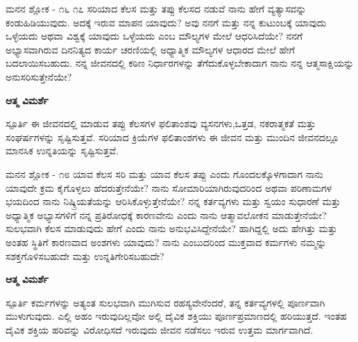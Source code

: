 \newpage
\begin{mananam}{\mananamfont \large ಮನನ ಶ್ಲೋಕ - ೧೬ ೧೭}
\mananamtext ಸರಿಯಾದ ಕೆಲಸ ಮತ್ತು ತಪ್ಪು ಕೆಲಸದ ನಡುವೆ ನಾನು ಹೇಗೆ ವ್ಯತ್ಯಾಸವನ್ನು ಕಂಡುಹಿಡಿಯುವುದು. ಅದಕ್ಕೆ ಇರುವ ಮಾಪನ ಯಾವುದು? ಅವು ನನಗೆ ಮತ್ತು ನನ್ನ ಕುಟುಂಬಕ್ಕೆ ಯಾವುದು ಒಳ್ಳೆಯದು ಅಥವಾ ವಿಶ್ವಕ್ಕೆ ಯಾವುದು ಒಳ್ಳೆಯದು ಎಂಬ ಮೌಲ್ಯಗಳ ಮೇಲೆ ಆಧರಿಸಿದೆಯೇ? ನನಗೆ ಅಭ್ಯಾಸವಾಗಿರುವ ದಿನನಿತ್ಯದ ಕಾರ್ಯ ಚರಣಿಯಲ್ಲಿ ಅಧ್ಯಾತ್ಮಿಕ ಮೌಲ್ಯಗಳ ಆಧಾರದ ಮೇಲೆ ಹೇಗೆ ಬದಲಾಯಿಸಬಹುದು. ನನ್ನ ಜೀವನದಲ್ಲಿ ಕಠಿಣ ನಿರ್ಧಾರಗಳನ್ನು ತೆಗೆದುಕೊಳ್ಳಬೇಕಾದಾಗ ನಾನು ನನ್ನ ಆತ್ಮಸಾಕ್ಷಿಯನ್ನು ಅನುಸರಿಸುತ್ತೇನೆಯೇ?
\end{mananam}
\WritingHand\enspace\textbf{ಆತ್ಮ ವಿಮರ್ಶೆ}\\
\begin{inspiration}{\mananamfont \large ಸ್ಪೂರ್ತಿ}
\mananamtext ಈ ಜೀವನದಲ್ಲಿ ಮಾಡುವ ತಪ್ಪು ಕೆಲಸಗಳ ಫಲಿತಾಂಶವು ವ್ಯಸನಗಳು,ಒತ್ತಡ, ನಕರಾತ್ಮಕತೆ ಮತ್ತು ಸಂಘರ್ಷಗಳನ್ನು ಸೃಷ್ಟಿಸುತ್ತವೆ. ಸರಿಯಾದ ಕ್ರಿಯೆಗಳ ಫಲಿತಾಂಶಗಳು ಈ ಜೀವನ ಮತ್ತು ಮುಂದಿನ ಜೀವನದಲ್ಲೂ ಮಾನಸಿಕ ಉನ್ನತಿಯನ್ನು ಸೃಷ್ಟಿಸುತ್ತವೆ.
\end{inspiration}
\newpage

\begin{mananam}{\mananamfont \large ಮನನ ಶ್ಲೋಕ - ೧೮}
\mananamtext ಯಾವ ಕೆಲಸ ಸರಿ ಮತ್ತು ಯಾವ ಕೆಲಸ ತಪ್ಪು ಎಂದು ಗೊಂದಲಕ್ಕೊಳಗಾದಾಗ ನಾನು ಯಾವುದೇ ಕ್ರಮ ಕೈಗೊಳ್ಳಲು ಹೆದರುತ್ತೇನೆಯೇ? ನಾನು  ಸೋಮಾರಿಯಾಗಿರುವುದರಿಂದ ಅಥವಾ ಪರಿಣಾಮಗಳ ಭಯದಿಂದ ನಾನು ನಿಷ್ಕ್ರಿಯತೆಯನ್ನು ಆರಿಸಿಕೊಳ್ಳುತ್ತೇನೆಯೇ? ನನ್ನ ಕರ್ತವ್ಯಗಳು ಮತ್ತು ಸ್ವಯಂ ಸುಧಾರಣೆ ಮತ್ತು ಅಧ್ಯಾತ್ಮಿಕ ಅಭ್ಯಾಸಗಳಿಗೆ ನನ್ನ ಪ್ರತಿರೋಧಕ್ಕೆ ಕಾರಣವೇನು ಎಂದು ನಾನು ಆತ್ಮಾವಲೋಕನ ಮಾಡುತ್ತೇನೆಯೇ?\\
ಸುಲಭವಾಗಿ ಕೆಲಸ ಮಾಡುವುದು ಹೇಗೆ ಎಂದು ನಾನು ಅನುಭವಿಸಿದ್ದೇನೆಯೇ? ಹಾಗಿದ್ದಲ್ಲಿ ಅದು ಹೇಗಿತ್ತು ಮತ್ತು ಅಂತಹ ಸ್ಥಿತಿಗೆ ಕಾರಣವಾದ ಅಂಶಗಳು ಯಾವುದು? ನಾನು ಎಂಬುದರಿಂದ ಮುಕ್ತವಾದ ಕರ್ಮಗಳು ನಮ್ಮನ್ನು ಸಶಕ್ತಗೊಳಿಸಬಹುದೇ ಮತ್ತು ಉನ್ನತಿಗೇರಿಸಬಹುದೇ?
\end{mananam}
\WritingHand\enspace\textbf{ಆತ್ಮ ವಿಮರ್ಶೆ}\\
\begin{inspiration}{\mananamfont \large ಸ್ಪೂರ್ತಿ}
\mananamtext ಕರ್ಮಗಳನ್ನು ಅತ್ಯಂತ ಸುಲಭವಾಗಿ ಮುಗಿಸುವ ರಹಸ್ಯವೇನೆಂದರೆ, ತನ್ನ ಕರ್ತವ್ಯಗಳಲ್ಲಿ ಪೂರ್ಣವಾಗಿ ಮುಳುಗುವುದು. ಎಲ್ಲಿ ಅಹಂ ಇರುವುದಿಲ್ಲವೋ ಅಲ್ಲಿ ದೈವಿಕ ಶಕ್ತಿಯು ಪೂರ್ಣಪ್ರಮಾಣದಲ್ಲಿ ಹರಿಯುತ್ತದೆ. ಇಂತಹ ದೈವಿಕ ಶಕ್ತಿಯ ಹರಿವನ್ನು ವಿರೋಧಿಸದೆ ಇರುವುದು ಜೀವನ ನಡೆಸಲು ಇರುವ ಉತ್ತಮ ಮಾರ್ಗವಾಗಿದೆ.
\end{inspiration}
\newpage


